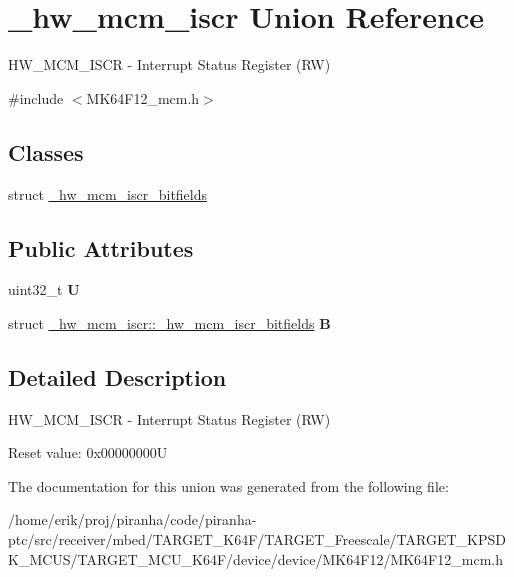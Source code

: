 \hypertarget{union__hw__mcm__iscr}{}\section{\+\_\+hw\+\_\+mcm\+\_\+iscr Union Reference}
\label{union__hw__mcm__iscr}


H\+W\+\_\+\+M\+C\+M\+\_\+\+I\+S\+CR -\/ Interrupt Status Register (RW)  




{\ttfamily \#include $<$M\+K64\+F12\+\_\+mcm.\+h$>$}

\subsection*{Classes}
\begin{DoxyCompactItemize}
\item 
struct \hyperlink{struct__hw__mcm__iscr_1_1__hw__mcm__iscr__bitfields}{\+\_\+hw\+\_\+mcm\+\_\+iscr\+\_\+bitfields}
\end{DoxyCompactItemize}
\subsection*{Public Attributes}
\begin{DoxyCompactItemize}
\item 
uint32\+\_\+t {\bfseries U}\hypertarget{union__hw__mcm__iscr_a9eeac21e7afb792de82afc6e34e65888}{}\label{union__hw__mcm__iscr_a9eeac21e7afb792de82afc6e34e65888}

\item 
struct \hyperlink{struct__hw__mcm__iscr_1_1__hw__mcm__iscr__bitfields}{\+\_\+hw\+\_\+mcm\+\_\+iscr\+::\+\_\+hw\+\_\+mcm\+\_\+iscr\+\_\+bitfields} {\bfseries B}\hypertarget{union__hw__mcm__iscr_a36c1ee4e9743844dcb975b2bdd050c4f}{}\label{union__hw__mcm__iscr_a36c1ee4e9743844dcb975b2bdd050c4f}

\end{DoxyCompactItemize}


\subsection{Detailed Description}
H\+W\+\_\+\+M\+C\+M\+\_\+\+I\+S\+CR -\/ Interrupt Status Register (RW) 

Reset value\+: 0x00000000U 

The documentation for this union was generated from the following file\+:\begin{DoxyCompactItemize}
\item 
/home/erik/proj/piranha/code/piranha-\/ptc/src/receiver/mbed/\+T\+A\+R\+G\+E\+T\+\_\+\+K64\+F/\+T\+A\+R\+G\+E\+T\+\_\+\+Freescale/\+T\+A\+R\+G\+E\+T\+\_\+\+K\+P\+S\+D\+K\+\_\+\+M\+C\+U\+S/\+T\+A\+R\+G\+E\+T\+\_\+\+M\+C\+U\+\_\+\+K64\+F/device/device/\+M\+K64\+F12/M\+K64\+F12\+\_\+mcm.\+h\end{DoxyCompactItemize}
